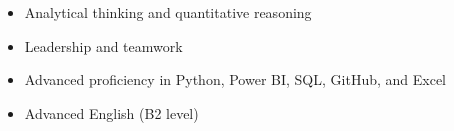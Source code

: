 \begin{itemize}[leftmargin=*]
  \item Analytical thinking and quantitative reasoning
  \item Leadership and teamwork
  \item Advanced proficiency in Python, Power BI, SQL, GitHub, and Excel
  \item Advanced English (B2 level)
\end{itemize}
